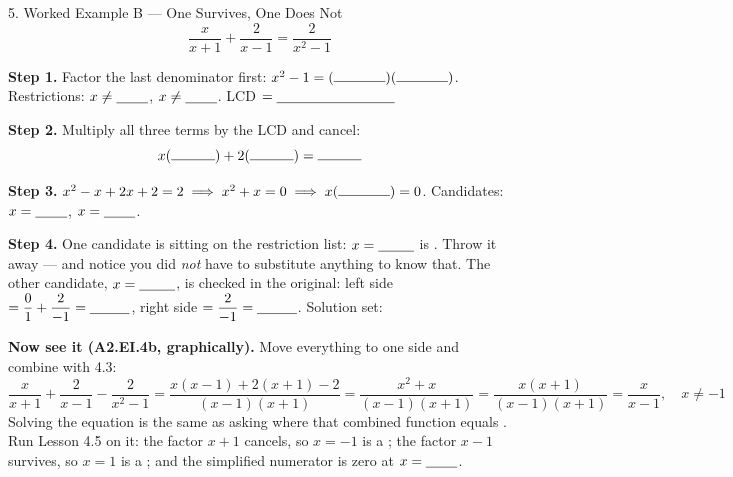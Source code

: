 \documentclass[10pt]{article}
\begin{document}
\begin{notesbox}{5. Worked Example B --- One Survives, One Does Not}
\[ \frac{x}{x+1}+\frac{2}{x-1}=\frac{2}{x^2-1} \]

\textbf{Step 1.} Factor the last denominator first: $x^2-1=(\rule{1.3cm}{0.4pt})(\rule{1.3cm}{0.4pt})$.
\; Restrictions: $x\neq\blank{0.8cm}$, $x\neq\blank{0.8cm}$. \; LCD $=\blank{3.0cm}$

\vspace{4pt}
\textbf{Step 2.} Multiply all three terms by the LCD and cancel:
\[ x(\rule{1.1cm}{0.4pt})+2(\rule{1.1cm}{0.4pt})=\rule{1.1cm}{0.4pt} \]

\vspace{2pt}
\textbf{Step 3.} $x^2-x+2x+2=2 \;\Longrightarrow\; x^2+x=0 \;\Longrightarrow\;
x(\rule{1.3cm}{0.4pt})=0$. \; Candidates: $x=\blank{0.8cm}$, $x=\blank{0.8cm}$.

\vspace{4pt}
\textbf{Step 4.} One candidate is sitting on the restriction list: $x=\blank{0.9cm}$ is
\blank{2.6cm}. Throw it away --- and notice you did \emph{not} have to substitute anything to know
that. The other candidate, $x=\blank{0.9cm}$, is checked in the original: left side
$=\dfrac{0}{1}+\dfrac{2}{-1}=\blank{1.0cm}$, right side $=\dfrac{2}{-1}=\blank{1.0cm}$. \;
Solution set: \blank{2.4cm}

\vspace{5pt}
\textbf{Now see it (A2.EI.4b, graphically).} Move everything to one side and combine with 4.3:
\[ \frac{x}{x+1}+\frac{2}{x-1}-\frac{2}{x^2-1}
   =\frac{x(x-1)+2(x+1)-2}{(x-1)(x+1)}=\frac{x^2+x}{(x-1)(x+1)}
   =\frac{x(x+1)}{(x-1)(x+1)}=\frac{x}{x-1},\quad x\neq-1 \]
Solving the equation is the same as asking where that combined function equals \blank{0.8cm}. Run
Lesson 4.5 on it: the factor $x+1$ cancels, so $x=-1$ is a \blank{1.2cm}; the factor $x-1$ survives,
so $x=1$ is a \blank{2.6cm}; and the simplified numerator is zero at $x=\blank{0.8cm}$.


\end{notesbox}
\end{document}
